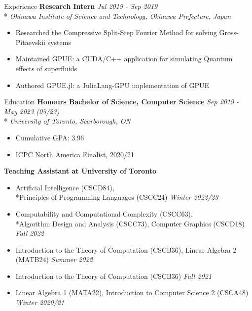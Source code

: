 \documentclass[11pt, letterpaper]{article}
\begin{document}
\begin{section}{Experience}
\textbf{Research Intern}
\hfill
\textit{Jul 2019 - Sep 2019}\\*
\textit{Okinawa Institute of Science and Technology, Okinawa Prefecture, Japan}
\begin{itemize}
  \item Researched the Compressive Split-Step Fourier Method for solving Gross-Pitaevskii systems
  \item Maintained GPUE: a CUDA/C++ application for simulating Quantum effects of superfluids
  \item Authored GPUE.jl: a JuliaLang-GPU implementation of GPUE
\end{itemize}

\end{section}

\begin{section}{Education}
\textbf{Honours Bachelor of Science, Computer Science}
\hfill
\textit{Sep 2019 - May 2023 (05/23)}\\*
\textit{University of Toronto, Scarborough, ON}
\begin{itemize}
  \item Cumulative GPA: 3.96
  \item ICPC North America Finalist, 2020/21 \\
\end{itemize}

\textbf{Teaching Assistant at University of Toronto}
\begin{itemize}
  \item Artificial Intelligence (CSCD84), \\*Principles of Programming Languages (CSCC24) \hfill \textit{Winter 2022/23}
  \item Computability and Computational Complexity (CSCC63), \\*Algorithm Design and Analysis (CSCC73), Computer Graphics (CSCD18) \hfill \textit{Fall 2022}
  \item Introduction to the Theory of Computation (CSCB36), Linear Algebra 2 (MATB24) \hfill \textit{Summer 2022}
  \item Introduction to the Theory of Computation (CSCB36) \hfill \textit{Fall 2021}
  \item Linear Algebra 1 (MATA22), Introduction to Computer Science 2 (CSCA48) \hfill \textit{Winter 2020/21}
\end{itemize}

\end{section}
\end{document}
